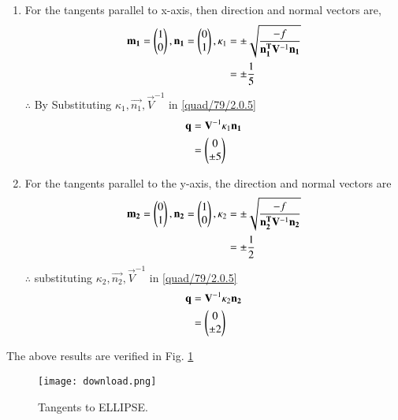 \documentclass[journal,12pt,twocolumn]{IEEEtran}
\begin{document}
\begin{enumerate}
\item For the tangents  parallel to x-axis, then direction and normal vectors are,
\begin{align}
\mathbf{m_1} = \begin{pmatrix}1\\0\end{pmatrix},\mathbf{n_1} = \begin{pmatrix}0\\1\end{pmatrix},
\kappa_1 &=\pm \sqrt{\frac{-f}{\mathbf{n_1^T}\mathbf{V}^{-1}\mathbf{n_1}}} \\
 &=\pm\frac{1}{5}
\end{align}
$\therefore$ By Substituting $\kappa_1,\vec{n_1},\vec{V}^{-1}$ in \eqref{quad/79/2.0.5}
\begin{align}
\mathbf{q}&=\mathbf{V}^{-1}\kappa_1\mathbf{n_1} \\
&=\begin{pmatrix}0\\\pm5\end{pmatrix}
\end{align}
\item For the tangents  parallel to the y-axis, the direction and normal vectors are
\begin{align}
\mathbf{m_2} = \begin{pmatrix}0\\1\end{pmatrix},\mathbf{n_2} = \begin{pmatrix}1\\0\end{pmatrix},
\kappa_2 &=\pm \sqrt{\frac{-f}{\mathbf{n_2^T}\mathbf{V}^{-1}\mathbf{n_2}}} \\
 &=\pm\frac{1}{2}
\end{align}
$\therefore$ substituting $\kappa_2,\vec{n_2},\vec{V}^{-1}$ in \eqref{quad/79/2.0.5}
\begin{align}
\mathbf{q}&=\mathbf{V}^{-1}\kappa_2\mathbf{n_2} \\
&=\begin{pmatrix}0\\\pm2\end{pmatrix}
\end{align}
\end{enumerate}
The above results are verified in Fig.     \ref{quad/79/fig:Tangent to ELLIPSE.}
%
\begin{figure}[!ht]
    \centering
    \texttt{[image: download.png]}
    \caption{Tangents to ELLIPSE.}
    \label{quad/79/fig:Tangent to ELLIPSE.}
\end{figure}  
\end{document}
